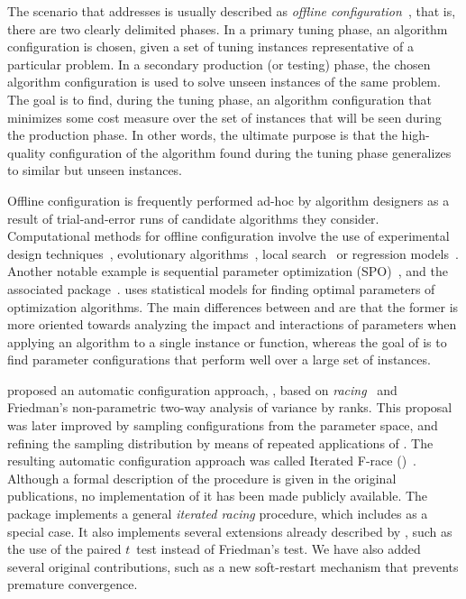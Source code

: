 \documentclass[article,a4paper,nojss,notitle]{jss}
\newcommand{\irace}{\pkg{irace}\xspace}
\newcommand{\FRACE}{\text{F-Race}\xspace}
\newcommand{\IFRACE}{\text{I/F-Race}\xspace}
\newcommand{\ttest}{$t$~test\xspace}
\begin{document}
The scenario that \irace addresses is usually described as
\emph{offline configuration}~\citep{Birattari09tuning}, that is, there
are two clearly delimited phases. In a primary tuning phase, an
algorithm configuration is chosen, given a set of tuning instances
representative of a particular problem. In a secondary production (or
testing) phase, the chosen algorithm configuration is used to solve
unseen instances of the same problem. The goal is to find, during the
tuning phase, an algorithm configuration that minimizes some cost
measure over the set of instances that will be seen during the
production phase. In other words, the ultimate purpose is that the high-quality
configuration of the algorithm found during the tuning phase
generalizes to similar but unseen instances.

Offline configuration is frequently performed ad-hoc by algorithm designers
as a result of trial-and-error runs of candidate algorithms they
consider. Computational methods for offline configuration involve the use of
experimental design
techniques~\citep{CoyGolRunWas2001,AdeLag06tuning}, evolutionary
algorithms~\citep{NanEib2006gecco,AnsSelTie2009cp}, local
search~\citep{HutHooLeyStu2009jair} or regression
models~\citep{HutHooLey2011lion}. Another notable example is
sequential parameter optimization (SPO)~\citep{Bar2006newexp}, and the
associated 
package~\citep{BarLasPre2010emaoa,R:SPOT}.  uses statistical
models for finding optimal parameters of optimization algorithms. The
main differences between  and \irace are that the former is
more oriented towards analyzing the impact and interactions of
parameters when applying an algorithm to a single instance or
function, whereas the goal of \irace is to find parameter
configurations that perform well over a large set of instances.


\citet{BirStuPaqVar02:gecco,Birattari2004PhD,Birattari09tuning}
proposed an automatic configuration approach, \FRACE, based on
\emph{racing}~\citep{MarMoo1997air} and Friedman's non-parametric two-way analysis of
variance by ranks. This proposal was later improved by sampling
configurations from the parameter space, and refining the sampling
distribution by means of repeated applications of \FRACE. The
resulting automatic configuration approach was called Iterated F-race
(\IFRACE)~\citep{BalBirStu07,BirYuaBal2010:emaoa}. Although a formal
description of the \IFRACE procedure is given in the original
publications, no implementation of it has been made publicly
available.  The \irace package implements a general \emph{iterated
  racing} procedure, which includes \IFRACE as a special case. It also
implements several extensions already described by
\citet{Birattari2004PhD,Birattari09tuning}, such as the use of the
paired \ttest instead of Friedman's test. We have also added several
original contributions, such as
a new soft-restart mechanism that prevents premature convergence.
\end{document}
